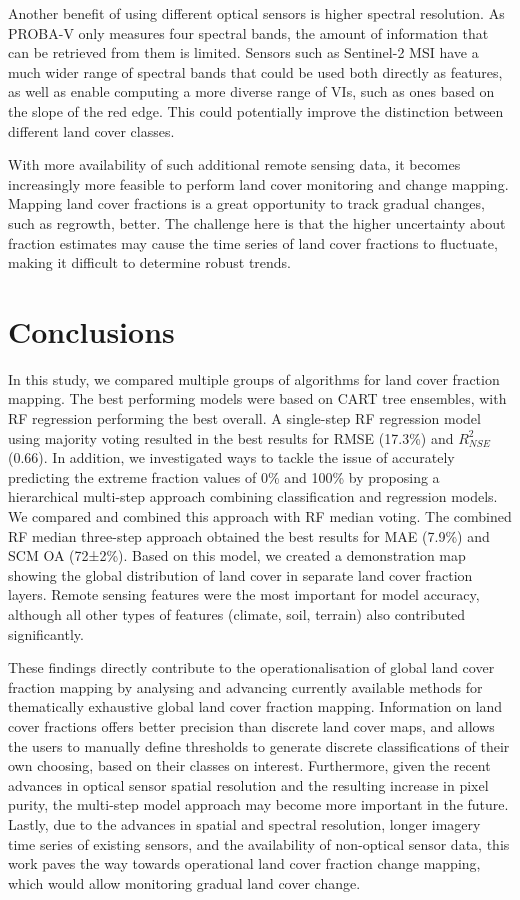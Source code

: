 \documentclass[review,authoryear,3p]{elsarticle}
\begin{document}
Another benefit of using different optical sensors is higher spectral resolution.
As PROBA-V only measures four spectral bands, the amount of information that can be retrieved from them is limited.
Sensors such as Sentinel-2 \gls{MSI} have a much wider range of spectral bands that could be used both directly as features, as well as enable computing a more diverse range of \glspl{VI}, such as ones based on the slope of the red edge.
This could potentially improve the distinction between different land cover classes.

With more availability of such additional remote sensing data, it becomes increasingly more feasible to perform land cover monitoring and change mapping.
Mapping land cover fractions is a great opportunity to track gradual changes, such as regrowth, better.
The challenge here is that the higher uncertainty about fraction estimates may cause the time series of land cover fractions to fluctuate, making it difficult to determine robust trends.

\section{Conclusions}

In this study, we compared multiple groups of algorithms for land cover fraction mapping.
The best performing models were based on \gls{CART} tree ensembles, with \gls{RF} regression performing the best overall.
A single-step \gls{RF} regression model using majority voting resulted in the best results for RMSE (17.3\%) and $R^2_{NSE}$ (0.66).
In addition, we investigated ways to tackle the issue of accurately predicting the extreme fraction values of 0\% and 100\% by proposing a hierarchical multi-step approach combining classification and regression models.
We compared and combined this approach with \gls{RF} median voting.
The combined \gls{RF} median three-step approach obtained the best results for \gls{MAE} (7.9\%) and \gls{SCM} \gls{OA} (72±2\%).
Based on this model, we created a demonstration map showing the global distribution of land cover in separate land cover fraction layers.
Remote sensing features were the most important for model accuracy, although all other types of features (climate, soil, terrain) also contributed significantly.

These findings directly contribute to the operationalisation of global land cover fraction mapping by analysing and advancing currently available methods for thematically exhaustive global land cover fraction mapping.
Information on land cover fractions offers better precision than discrete land cover maps, and allows the users to manually define thresholds to generate discrete classifications of their own choosing, based on their classes on interest.
Furthermore, given the recent advances in optical sensor spatial resolution and the resulting increase in pixel purity, the multi-step model approach may become more important in the future.
Lastly, due to the advances in spatial and spectral resolution, longer imagery time series of existing sensors, and the availability of non-optical sensor data, this work paves the way towards operational land cover fraction change mapping, which would allow monitoring gradual land cover change.
\end{document}

